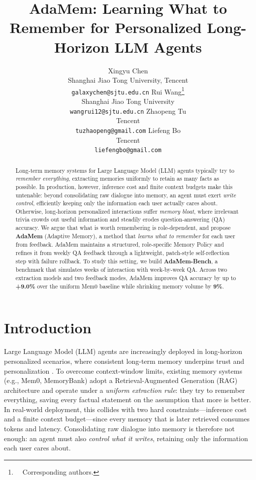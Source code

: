 \documentclass[11pt]{article}
\title{AdaMem: Learning What to Remember for Personalized Long-Horizon LLM Agents}
\author{%
  Xingyu Chen \\
  Shanghai Jiao Tong University, Tencent \\
  \texttt{galaxychen@sjtu.edu.cn}
  \And
  Rui Wang\thanks{\ \ Corresponding authors.} \\
  Shanghai Jiao Tong University \\
  \texttt{wangrui12@sjtu.edu.cn}
  \AND
  Zhaopeng Tu\footnotemark[\value{footnote}] \\
  Tencent \\
  \texttt{tuzhaopeng@gmail.com}
  \And
  Liefeng Bo \\
  Tencent \\
  \texttt{liefengbo@gmail.com}}
\begin{document}
\maketitle
\begin{abstract}
Long-term memory systems for Large Language Model (LLM) agents typically try to \emph{remember everything}, extracting memories uniformly to retain as many facts as possible. In production, however, inference cost and finite context budgets make this untenable: beyond consolidating raw dialogue into memory, an agent must exert \emph{write control}, efficiently keeping only the information each user actually cares about. Otherwise, long-horizon personalized interactions suffer \emph{memory bloat}, where irrelevant trivia crowds out useful information and steadily erodes question-answering (QA) accuracy. We argue that what is worth remembering is role-dependent, and propose \textbf{AdaMem} (Adaptive Memory), a method that \emph{learns what to remember} for each user from feedback. AdaMem maintains a structured, role-specific Memory Policy and refines it from weekly QA feedback through a lightweight, patch-style self-reflection step with failure rollback. To study this setting, we build \textbf{AdaMem-Bench}, a benchmark that simulates weeks of interaction with week-by-week QA. Across two extraction models and two feedback modes, AdaMem improves QA accuracy by up to \textbf{+9.0\%} over the uniform Mem0 baseline while shrinking memory volume by \textbf{9\%}.
\end{abstract}

\section{Introduction}
Large Language Model (LLM) agents are increasingly deployed in long-horizon personalized scenarios, where consistent long-term memory underpins trust and personalization \cite{park2023generative, wang2023survey}. To overcome context-window limits, existing memory systems (e.g., Mem0, MemoryBank) adopt a Retrieval-Augmented Generation (RAG) architecture \cite{lewis2020retrieval, packer2023memgpt, zhong2023memory} and operate under a \textit{uniform extraction rule}: they try to remember everything, saving every factual statement on the assumption that more is better. In real-world deployment, this collides with two hard constraints---inference cost and a finite context budget---since every memory that is later retrieved consumes tokens and latency. Consolidating raw dialogue into memory is therefore not enough: an agent must also \emph{control what it writes}, retaining only the information each user cares about.
\end{document}
